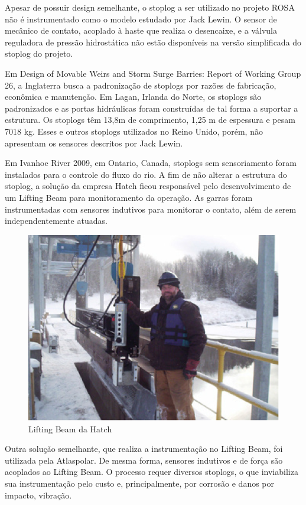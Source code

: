 Apesar de possuir design semelhante, o stoplog a ser utilizado no projeto ROSA não é instrumentado como o modelo estudado por Jack Lewin. O sensor de mecânico de contato, acoplado à haste que realiza o desencaixe, e a válvula reguladora de pressão hidrostática não estão disponíveis na versão simplificada do stoplog do projeto.

Em Design of Movable Weirs and Storm Surge Barries: Report of Working Group 26,
a Inglaterra busca a padronização de stoplogs por razões de fabricação, econômica e manutenção. Em Lagan, Irlanda do Norte, os stoplogs são padronizados e as portas hidráulicas foram construídas de tal forma a suportar a estrutura. Os stoplogs têm 13,8m de comprimento, 1,25 m de espessura e pesam 7018 kg. Esses e outros stoplogs utilizados no Reino Unido, porém, não apresentam os sensores descritos por Jack Lewin.

Em Ivanhoe River 2009, em Ontario, Canada, stoplogs sem sensoriamento foram instalados para o controle do fluxo do rio. A fim de não alterar a estrutura do stoplog, a solução da empresa Hatch ficou responsável pelo desenvolvimento de um Lifting Beam para monitoramento da operação. As garras foram instrumentadas com sensores indutivos para monitorar o contato, além de serem independentemente atuadas.

\begin{figure}[H]
    \centering
    \includegraphics[width=0.5\columnwidth]{figs/pesqbib/9.png}
    \caption{Lifting Beam da Hatch}
    \label{pesqbib_9}
\end{figure}  
 
 
Outra solução semelhante, que realiza a instrumentação no Lifting Beam, foi utilizada pela Atlaspolar. De mesma forma, sensores indutivos e de força são acoplados ao Lifting Beam. O processo requer diversos stoplogs, o que inviabiliza sua instrumentação pelo custo e, principalmente, por corrosão e danos por impacto, vibração. 

